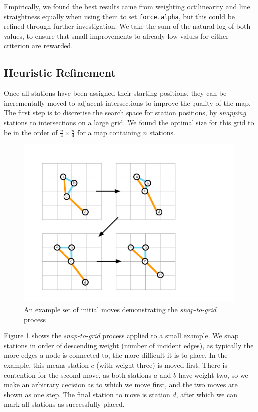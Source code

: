 Empirically, we found the best results came from weighting octilinearity and line straightness equally when using them to set \texttt{force.alpha}, but this could be refined through further investigation. We take the sum of the natural log of both values, to ensure that small improvements to already low values for either criterion are rewarded.

\subsection{Heuristic Refinement}

Once all stations have been assigned their starting positions, they can be incrementally moved to adjacent intersections to improve the quality of the map. The first step is to discretise the search space for station positions, by \textit{snapping} stations to intersections on a large grid. We found the optimal size for this grid to be in the order of $\frac{n}{4}\times\frac{n}{4}$ for a map containing $n$ stations.

\begin{figure}[htbp!]
	\centering
	\includegraphics[width=\textwidth]{img/implementation/snap.pdf}
	\caption{An example set of initial moves demonstrating the \textit{snap-to-grid} process}
	\label{fig:snap}
\end{figure}

Figure \ref{fig:snap} shows the \textit{snap-to-grid} process applied to a small example. We snap stations in order of descending weight (number of incident edges), as typically the more edges a node is connected to, the more difficult it is to place. In the example, this means station $c$ (with weight three) is moved first. There is contention for the second move, as both stations $a$ and $b$ have weight two, so we make an arbitrary decision as to which we move first, and the two moves are shown as one step. The final station to move is station $d$, after which we can mark all stations as successfully placed. 

